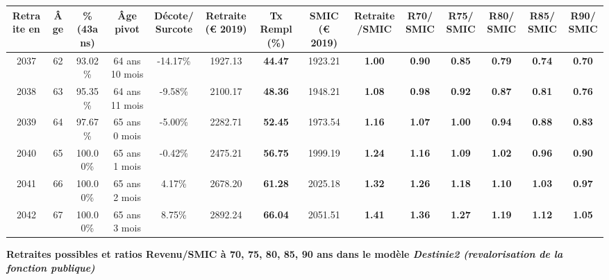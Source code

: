 \begin{adjustbox}{max width=\textwidth} 
\begin{tabular}[htb]{|c|c||c|c|c||c|c||c|c||c|c|c|c|c|} 
\hline 
 Retraite en &  Âge &  \%(43ans) &  Âge pivot &  Décote/Surcote &  Retraite (\euro{} 2019) &  Tx Rempl(\%) &  SMIC (\euro{} 2019) &  Retraite/SMIC &  R70/SMIC &  R75/SMIC &  R80/SMIC &  R85/SMIC &  R90/SMIC \\ 
\hline \hline 
 2037 &  62 &  93.02\% &  64 ans 10 mois &  -14.17\% &  1927.13 &  {\bf 44.47} &  1923.21 &  {\bf 1.00} &  {\bf {\color{red} 0.90}} &  {\bf {\color{red} 0.85}} &  {\bf {\color{red} 0.79}} &  {\bf {\color{red} 0.74}} &  {\bf {\color{red} 0.70}} \\ 
\hline 
 2038 &  63 &  95.35\% &  64 ans 11 mois &  -9.58\% &  2100.17 &  {\bf 48.36} &  1948.21 &  {\bf 1.08} &  {\bf {\color{red} 0.98}} &  {\bf {\color{red} 0.92}} &  {\bf {\color{red} 0.87}} &  {\bf {\color{red} 0.81}} &  {\bf {\color{red} 0.76}} \\ 
\hline 
 2039 &  64 &  97.67\% &  65 ans 0 mois &  -5.00\% &  2282.71 &  {\bf 52.45} &  1973.54 &  {\bf 1.16} &  {\bf 1.07} &  {\bf 1.00} &  {\bf {\color{red} 0.94}} &  {\bf {\color{red} 0.88}} &  {\bf {\color{red} 0.83}} \\ 
\hline 
 2040 &  65 &  100.00\% &  65 ans 1 mois &  -0.42\% &  2475.21 &  {\bf 56.75} &  1999.19 &  {\bf 1.24} &  {\bf 1.16} &  {\bf 1.09} &  {\bf 1.02} &  {\bf {\color{red} 0.96}} &  {\bf {\color{red} 0.90}} \\ 
\hline 
 2041 &  66 &  100.00\% &  65 ans 2 mois &  4.17\% &  2678.20 &  {\bf 61.28} &  2025.18 &  {\bf 1.32} &  {\bf 1.26} &  {\bf 1.18} &  {\bf 1.10} &  {\bf 1.03} &  {\bf {\color{red} 0.97}} \\ 
\hline 
 2042 &  67 &  100.00\% &  65 ans 3 mois &  8.75\% &  2892.24 &  {\bf 66.04} &  2051.51 &  {\bf 1.41} &  {\bf 1.36} &  {\bf 1.27} &  {\bf 1.19} &  {\bf 1.12} &  {\bf 1.05} \\ 
\hline 
\hline 
\end{tabular} 
\end{adjustbox} 
 
 \vspace{0.1cm} 
{\bf \noindent Retraites possibles et ratios Revenu/SMIC à 70, 75, 80, 85, 90 ans dans le modèle \emph{Destinie2 (revalorisation de la fonction publique)}}  
 
